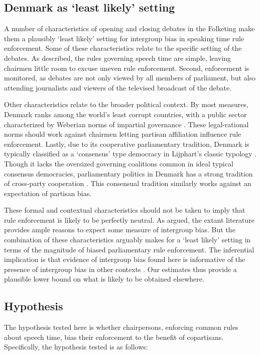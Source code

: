 \documentclass[12pt,a4paper]{article}
\begin{document}
\subsection{Denmark as `least likely' setting}

A number of characteristics of opening and closing debates in the Folketing make them a plausibly `least likely' setting for intergroup bias in speaking time rule enforcement. Some of these characteristics relate to the specific setting of the debates. As described, the rules governing speech time are simple, leaving chairmen little room to excuse uneven rule enforcement. Second, enforcement is monitored, as debates are not only viewed by all members of parliament, but also attending journalists and viewers of the televised broadcast of the debate.

Other characteristics relate to the broader political context. By most measures, Denmark ranks among the world's least corrupt countries, with a public sector characterized by Weberian norms of impartial governance \citep{Treisman2000}. These legal-rational norms should work against chairmen letting partisan affiliation influence rule enforcement. Lastly, due to its cooperative parliamentary tradition, Denmark is typically classified as a `consensus' type democracy in Lijphart's classic typology \citep{Lijphart1999,Esaiasson2000}. Though it lacks the oversized governing coalitions common in ideal typical consensus democracies, parliamentary politics in Denmark has a strong tradition of cross-party cooperation \cite{Green-Pedersen2005}. This consensual tradition similarly works against an expectation of partisan bias.

These formal and contextual characteristics should not be taken to imply that rule enforcement is likely to be perfectly neutral. As argued, the extant literature provides ample reasons to expect some measure of intergroup bias. But the combination of these characteristics arguably makes for a `least likely' setting in terms of the magnitude of biased parliamentary rule enforcement. The inferential implication is that evidence of intergroup bias found here is informative of the presence of intergroup bias in other contexts \citep{Levy2008}. Our estimates thus provide a plausible lower bound on what is likely to be obtained elsewhere.

\subsection{Hypothesis}
The hypothesis tested here is whether chairpersons, enforcing common rules about speech time, bias their enforcement to the benefit of copartisans. Specifically, the hypothesis tested is as follows:
\end{document}
